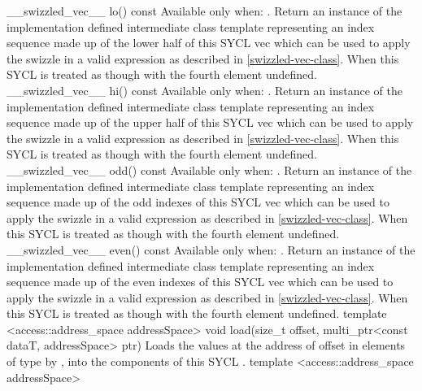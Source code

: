   \addRow
    {\__swizzled_vec__ lo() const}
    {
      Available only when: .
      Return an instance of the implementation defined intermediate class template  representing an index sequence made up of the lower half of this SYCL vec which can be used to apply the swizzle in a valid expression as described in \ref{swizzled-vec-class}. When  this SYCL  is treated as though  with the fourth element undefined.
    }
  \addRow
    {\__swizzled_vec__ hi() const}
    {
      Available only when: .
      Return an instance of the implementation defined intermediate class template  representing an index sequence made up of the upper half of this SYCL vec which can be used to apply the swizzle in a valid expression as described in \ref{swizzled-vec-class}. When  this SYCL  is treated as though  with the fourth element undefined.
    }
  \addRow
    {\__swizzled_vec__ odd() const}
    {
      Available only when: .
      Return an instance of the implementation defined intermediate class template  representing an index sequence made up of the odd indexes of this SYCL vec which can be used to apply the swizzle in a valid expression as described in \ref{swizzled-vec-class}. When  this SYCL  is treated as though  with the fourth element undefined.
    }    
  \addRow
    {\__swizzled_vec__ even() const}
    {
      Available only when: .
      Return an instance of the implementation defined intermediate class template  representing an index sequence made up of the even indexes of this SYCL vec which can be used to apply the swizzle in a valid expression as described in \ref{swizzled-vec-class}. When  this SYCL  is treated as though  with the fourth element undefined.
    }
  \addRowTwoL
  {template <access::address_space addressSpace>}
  {void load(size_t offset, multi_ptr<const dataT, addressSpace> ptr)}
  {
    Loads the values at the address of  offset in elements of type  by , into the components of this SYCL .
  }
  \addRowTwoL
  {template <access::address_space addressSpace>}
